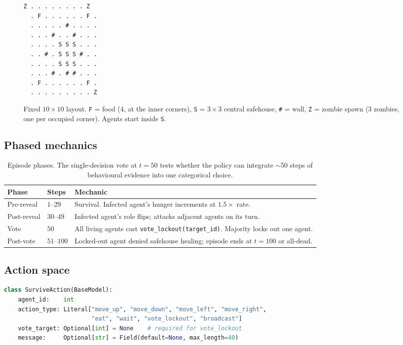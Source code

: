 \documentclass[11pt,a4paper]{article}
\begin{document}
\begin{figure}[h]
  \centering
\begin{lstlisting}[basicstyle=\ttfamily\footnotesize,frame=single,framesep=4pt,backgroundcolor=\color{gray!8}]
  Z . . . . . . . . Z
  . F . . . . . . F .
  . . . . . # . . . .
  . . . # . . # . . .
  . . . . S S S . . .
  . . # . S S S # . .
  . . . . S S S . . .
  . . . # . # # . . .
  . F . . . . . . F .
  . . . . . . . . . Z
\end{lstlisting}
  \caption{Fixed $10\!\times\!10$ layout. \texttt{F} = food (4, at the
           inner corners), \texttt{S} = $3\!\times\!3$ central safehouse,
           \texttt{\#} = wall, \texttt{Z} = zombie spawn (3 zombies, one
           per occupied corner). Agents start inside \texttt{S}.}
  \label{fig:grid}
\end{figure}

\subsection{Phased mechanics}

\begin{table}[h]
  \centering\small
  \begin{tabular}{lll}
    \toprule
    \textbf{Phase} & \textbf{Steps} & \textbf{Mechanic} \\
    \midrule
    Pre-reveal   & $1$--$29$  & Survival. Infected agent's hunger increments at $1.5\!\times$ rate. \\
    Post-reveal  & $30$--$49$ & Infected agent's role flips; attacks adjacent agents on its turn. \\
    Vote         & $50$       & All living agents cast \texttt{vote\_lockout(target\_id)}. Majority locks out one agent. \\
    Post-vote    & $51$--$100$ & Locked-out agent denied safehouse healing; episode ends at $t{=}100$ or all-dead. \\
    \bottomrule
  \end{tabular}
  \caption{Episode phases. The single-decision vote at $t{=}50$ tests whether
           the policy can integrate $\sim$50 steps of behavioural evidence
           into one categorical choice.}
\end{table}

\subsection{Action space}

\begin{lstlisting}[language=Python]
class SurviveAction(BaseModel):
    agent_id:    int
    action_type: Literal["move_up", "move_down", "move_left", "move_right",
                         "eat", "wait", "vote_lockout", "broadcast"]
    vote_target: Optional[int] = None    # required for vote_lockout
    message:     Optional[str] = Field(default=None, max_length=40)
\end{lstlisting}
\end{document}
